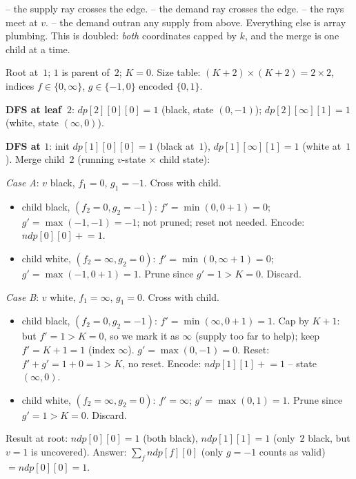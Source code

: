 \begin{notebox}
 -- the supply ray crosses the edge.
 -- the demand ray crosses the edge.
 -- the rays meet at $v$.
 -- the demand outran any supply from above.
Everything else is array plumbing. This is  doubled:
\emph{both} coordinates capped by $k$, and the merge is one child at a time.
\end{notebox}

\begin{tracebox}[Sample~1 -- $n = 2$, $k = 0$, edge $1$--$2$ (answer $1$)]
Root at~$1$; $1$ is parent of~$2$; $K=0$. Size table: $(K+2) \times (K+2) = 2 \times 2$,
indices $f \in \{0, \infty\}$, $g \in \{-1, 0\}$ encoded $\{0, 1\}$.

\textbf{DFS at leaf~$2$}: $\mathit{dp}[2][0][0] = 1$ (black, state $(0, -1)$);
$\mathit{dp}[2][\infty][1] = 1$ (white, state $(\infty, 0)$).

\textbf{DFS at $1$}: init $\mathit{dp}[1][0][0] = 1$ (black at~$1$), $\mathit{dp}[1][\infty][1] = 1$ (white at~$1$).
Merge child~$2$ (running $v$-state $\times$ child state):

\emph{Case A}: $v$ black, $f_1 = 0$, $g_1 = -1$. Cross with child.
  \begin{itemize}[nosep]
    \item[(a1)] child black, $(f_2 = 0, g_2 = -1)$: $f' = \min(0, 0+1) = 0$;
      $g' = \max(-1, -1) = -1$; not pruned; reset not needed. Encode: $\mathit{ndp}[0][0] \mathrel{+}= 1$.
    \item[(a2)] child white, $(f_2 = \infty, g_2 = 0)$: $f' = \min(0, \infty + 1) = 0$;
      $g' = \max(-1, 0 + 1) = 1$. Prune since $g' = 1 > K = 0$. Discard.
  \end{itemize}
\emph{Case B}: $v$ white, $f_1 = \infty$, $g_1 = 0$. Cross with child.
  \begin{itemize}[nosep]
    \item[(b1)] child black, $(f_2 = 0, g_2 = -1)$: $f' = \min(\infty, 0+1) = 1$.
      Cap by $K+1$: but $f' = 1 > K = 0$, so we mark it as $\infty$ (supply too far to help);
      keep $f' = K+1 = 1$ (index $\infty$). $g' = \max(0, -1) = 0$. Reset: $f' + g' = 1 + 0 = 1 > K$, no reset.
      Encode: $\mathit{ndp}[1][1] \mathrel{+}= 1$ -- state $(\infty, 0)$.
    \item[(b2)] child white, $(f_2 = \infty, g_2 = 0)$: $f' = \infty$; $g' = \max(0, 1) = 1$.
      Prune since $g' = 1 > K = 0$. Discard.
  \end{itemize}

Result at root: $\mathit{ndp}[0][0] = 1$ (both black), $\mathit{ndp}[1][1] = 1$ (only~$2$ black, but $v = 1$ is uncovered).
Answer: $\sum_f \mathit{ndp}[f][0]$ (only $g = -1$ counts as valid) $= \mathit{ndp}[0][0] = 1$. \checkmark
\end{tracebox}

